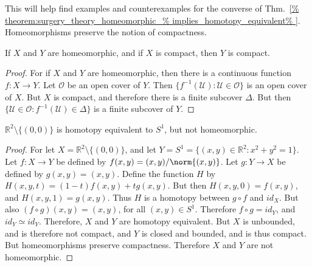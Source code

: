 \documentclass[crop=false,class=article,oneside]{standalone}
\begin{document}
        This will help find examples and counterexamples for
        the converse of Thm.~\ref{%
            theorem:surgery_theory_homeomorphic_%
            implies_homotopy_equivalent%
        }. Homeomorphisms preserve the notion of compactness.
        \begin{theorem}
            If $X$ and $Y$ are homeomorphic, and if
            $X$ is compact, then $Y$ is compact.
        \end{theorem}
        \begin{proof}
            For if $X$ and $Y$ are homeomorphic, then there
            is a continuous function $f:X\rightarrow{Y}$.
            Let $\mathcal{O}$ be an open cover of $Y$.
            Then $\{f^{-1}(\mathcal{U}):\mathcal{U}\in\mathcal{O}\}$
            is an open cover of $X$. But $X$ is compact, and
            therefore there is a finite subcover
            $\Delta$. But then
            $\{\mathcal{U}\in\mathcal{O}:%
             f^{-1}(\mathcal{U})\in\Delta\}$ is a finite
            subcover of $Y$.
        \end{proof}
        \begin{theorem}
            \label{%
                theorem:surgery_theory_Homotopy_%
                equivalance_of_plane_without_point_and_unit_%
                disc_but_not_homeomorphic%
            }
            $\mathbb{R}^{2}\setminus\{(0,0)\}$ is homotopy
            equivalent to $S^{1}$, but not homeomorphic.
        \end{theorem}
        \begin{proof}
            For let $X=\mathbb{R}^{2}\setminus\{(0,0)\}$,
            and let
            $Y=S^{1}=\{(x,y)\in\mathbb{R}^{2}:x^{2}+y^{2}=1\}$.
            Let $f:{X}\rightarrow{Y}$ be defined by
            $f(x,y)=(x,y)/\norm{(x,y)}$. Let
            $g:{Y}\rightarrow{X}$ be defined by $g(x,y)=(x,y)$.
            Define the function $H$ by
            $H(x,y,t)=(1-t)f(x,y)+tg(x,y)$.
            But then $H(x,y,0)=f(x,y)$,
            and $H(x,y,1)=g(x,y)$. Thus $H$ is a
            homotopy between ${g}\circ{f}$ and $id_{X}$. But also
            $({f}\circ{g})(x,y)=(x,y)$, for all $(x,y)\in S^{1}$.
            Therefore ${f}\circ{g}=id_{Y}$, and
            ${id_{Y}}\simeq{id_{Y}}$. Therefore, $X$ and $Y$ are
            homotopy equivalent. But $X$ is unbounded,
            and is therefore not compact,
            and $Y$ is closed and bounded,
            and is thus compact. But homeomorphisms
            preserve compactness. Therefore $X$ and $Y$ are
            not homeomorphic.
        \end{proof}
\end{document}

